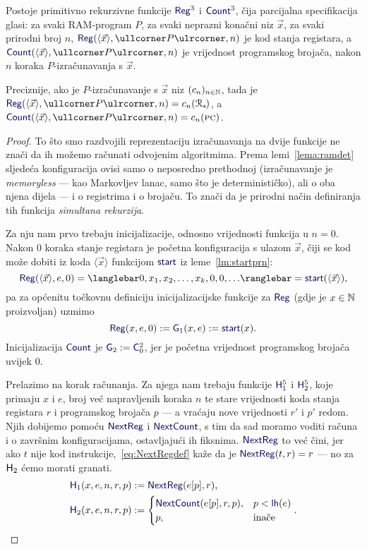 \begin{lema}[{name=[primitivna rekurzivnost RAM-izračunavanja]}]\label{lm:RegCountprn}
Postoje primitivno rekurzivne funkcije $\f{Reg}^3$ i $\f{Count}^3$, čija parcijalna specifikacija glasi:
za svaki RAM-program $P$, za svaki neprazni konačni niz $\vec x$, za svaki prirodni broj $n$, $\f{Reg}(\langle \vec x\rangle,\kprog{P},n)$ je kod stanja registara, a $\f{Count}(\langle \vec x\rangle,\kprog{P},n)$ je vrijednost programskog brojača, nakon $n$ koraka $P$-izračunavanja s $\vec x$.
\end{lema}
Preciznije, ako je $P$-izračunavanje s $\vec x$ niz $(c_n)_{n\in{\mathbb N}}$, tada je $\f{Reg}(\langle\vec x\rangle, \kprog{P},n)=c_n(\reg{*}\mspace{-2mu})$, a $\f{Count}(\langle\vec x\rangle,\kprog{P},n)=c_n(\textsc{pc})$.
\begin{proof}
    To što smo razdvojili reprezentaciju izračunavanja na dvije funkcije ne znači da ih možemo računati odvojenim algoritmima. Prema lemi~\ref{lema:ramdet} sljedeća konfiguracija ovisi samo o neposredno prethodnoj (izračunavanje je \emph{memoryless} --- kao Markovljev lanac, samo što je determinističko), ali o oba njena dijela --- i o registrima i o brojaču. To znači da je prirodni način definiranja tih funkcija \emph{simultana rekurzija}.

Za nju nam prvo trebaju inicijalizacije, odnosno vrijednosti funkcija u $n=0$. Nakon $0$ koraka stanje registara je početna konfiguracija s ulazom $\vec x$, čiji se kod može dobiti iz koda $\langle\vec x\rangle$ funkcijom $\f{start}$ iz leme~\ref{lm:startprn}:
\begin{equation}
    \f{Reg}(\langle\vec x\rangle,e,0)=\knk{0,x_1,x_2,\dotsc,x_k,0,0,\dotsc}=\f{start}(\langle\vec x\rangle)\text,
\end{equation}
pa za općenitu točkovnu definiciju inicijalizacijske funkcije za $\f{Reg}$ (gdje je $x\in{\mathbb N}$ proizvoljan) uzmimo
\begin{equation}
    \f{Reg}(x,e,0):=\f G_1(x,e):=\f{start}(x)\text.
\end{equation}
Inicijalizacija $\f{Count}$ je $\f G_2:=\f C_0^2$, jer je početna vrijednost programskog brojača uvijek $0$.

Prelazimo na korak računanja. Za njega nam trebaju funkcije $\f H_1^5$ i $\f H_2^5$, koje primaju $x$ i $e$, broj već napravljenih koraka $n$ te stare vrijednosti koda stanja registara $r$ i programskog brojača $p$ --- a vraćaju nove vrijednosti $r'$ i $p'$ redom. Njih dobijemo pomoću $\f{NextReg}$ i $\f{NextCount}$, s tim da sad moramo voditi računa i o završnim konfiguracijama, ostavljajući ih fiksnima. $\f{NextReg}$ to već čini, jer ako $t$ nije kod instrukcije,~\eqref{eq:NextRegdef} kaže da je $\f{NextReg}(t,r)=r$ --- no za $\f H_2$ ćemo morati granati.
\begin{align}
    \f H_1(x,e,n,r,p)&:=\f{NextReg}(e[p],r)\text,\\
    \f H_2(x,e,n,r,p)&:=\begin{cases}
        \f{NextCount}(e[p],r,p),&
        p<\f{lh}(e)\\
        p,&\text{inače}
    \end{cases}\text.
\end{align}


\end{proof}
